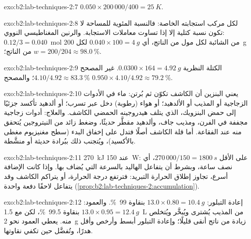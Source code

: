 \begin{solution}{exo:b2:lab-techniques-2:7}
$0.050 \times 200\,000/400 = \qty{25}{K}$.
\end{solution}

\begin{solution}{exo:b2:lab-techniques-2:8}
لكل مركب استجابته الخاصة: فالنسبة المئوية للمساحة لا تكون نسبة كتلية إلا إذا تساوت معاملات
الاستجابة. والرنين المغناطيسي النووي: $0.12/3 = 0.040$~mol من الشائبة لكل مول من الناتج، أي $0.040 \times 100 = \qty{4}{g}$
لكل \qty{200}{g} من الناتج؛ $w = 200/204 \approx 98.0~\%$.
\end{solution}

\begin{solution}{exo:b2:lab-techniques-2:9}
الكتلة النظرية $0.0300 \times 164 = \qty{4.92}{g}$. غير المصحح $4.10/4.92 \approx 83.3~\%$؛ والمصحح
$0.950 \times 4.10/4.92 \approx 79.2~\%$.
\end{solution}

\begin{solution}{exo:b2:lab-techniques-2:10}
يعني البنزين أن الكاشف تكوّن ثم بُرتن: ماء في الأدوات الزجاجية أو المذيب أو
الألدهيد؛ أو هواء (رطوبة) دخل عبر تسرب؛ أو ألدهيد تأكسد جزئيًا إلى حمض البنزويك، الذي يتلف
هيدروجينه الحمضي الكاشف. والعلاج: أدوات زجاجية مجففة في الفرن، ومذيب جاف، وألدهيد مقطَّر حديثًا،
وضغط زائد من النيتروجين يُتحقق منه عند الفقاعة. أما قلة الكاشف أصلًا فتدل على
إخفاق البدء (سطح مغنيزيوم مغطى بالأكسيد)، ويُتجنب ذلك ببُرادة حديثة أو منشَّطة.
\end{solution}

\begin{solution}{exo:b2:lab-techniques-2:11}
\qty{270}{kJ} عند \qty{150}{W}: على الأقل $270\,000/150 = \qty{1800}{s}$، أي نصف ساعة، وبشرط أن
يتفاعل الهاليد بالسرعة التي يُضاف بها. وإذا كانت الإضافة أسرع، تجاوز إطلاق الحرارة التبريد: فترتفع درجة الحرارة،
أو يتراكم الكاشف وقد يتفاعل لاحقًا دفعة واحدة (\cref{prop:b2:lab-techniques-2:accumulation}).
\end{solution}

\begin{solution}{exo:b2:lab-techniques-2:12}
إعادة التبلور: $13.0 \times 0.80 = \qty{10.4}{g}$ بنقاوة 99~\%. والعمود: $13.0 \times 0.95 =
\qty{12.4}{g}$ بنقاوة 99.5~\%، لكن مع \qty{1.5}{L} من المذيب يُشترى ويُبخَّر ويُتخلص منه. يعطي العمود
نحو \qty{2}{g} زيادة من ناتج أنقى قليلًا؛ وإعادة التبلور أبسط وأرخص وأقل
هدرًا، وتُفضَّل حين تكفي نقاوتها.
\end{solution}

